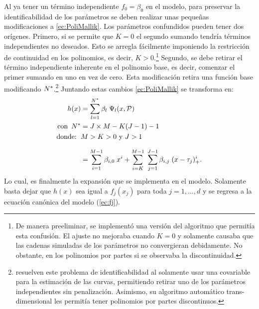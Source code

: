 \documentclass[../Main/Main.tex]{subfiles}
\begin{document}
Al ya tener un término independiente $f_0 = \beta_0$ en el modelo, para preservar la identificabilidad de los parámetros se deben realizar unas pequeñas modificaciones a \eqref{ec:PoliMallik}. Los parámetros confundidos pueden tener dos orígenes. Primero, si se permite que $K = 0$ el segundo sumando tendría términos independientes no deseados. Esto se arregla fácilmente imponiendo la restricción de continuidad en los polinomios, es decir, $K > 0$.\footnote{De manera preeliminar, se implementó una versión del algoritmo que permitía esta confusión. El ajuste no mejoraba cuando $K = 0$ y solamente causaba que las cadenas simuladas de los parámetros no convergieran debidamente. No obstante, en los polinomios por partes si se observaba la discontinuidad.} Segundo, se debe retirar el término independiente inherente en el polinomio base, es decir, comenzar el primer sumando en uno en vez de cero. Esta modificación retira una función base modificando $N^*$.\footnote{\citeauthor{mallik1990automatic} resuelven este problema de identificabilidad al solamente usar una covariable para la estimación de las curvas, permitiendo retirar uno de los parámetros independientes sin penalización. Asimismo, su algoritmo automático trans-dimensional les permitía tener polinomios por partes discontinuos.} Juntando estas cambios \eqref{ec:PoliMallik} se transforma en:
\begin{align}
	h(x) &= \sum_{l = 1}^{N^*} \beta_l \; \Psi_l(x,\mathcal{P}) \nonumber\\ 
	\text{con } \, N^* &= J\times M - K(J-1) - 1\nonumber \\
	\text{donde: } \, & M > K > 0 \text{ y } J > 1 \nonumber \\[7pt]
 		 &=	\sum_{i = 1}^{M - 1} \beta_{i,0} \; x^{i} + 
		\sum_{i = K}^{M-1} \;
	 		\sum_{j = 1}^{J-1}\beta_{i,j}\;(x - \tau_j)_+^{i}.
	 			\label{ec:PoliFinal}
\end{align}
Lo cual, es finalmente la expansión que se implementa en el modelo. Solamente basta dejar que $h(x)$ sea igual a $f_j(x_j)$ para toda $j = 1,\ldots,d$ y se regresa a la ecuación canónica del modelo (\ref{ec:fj}).
\end{document}
